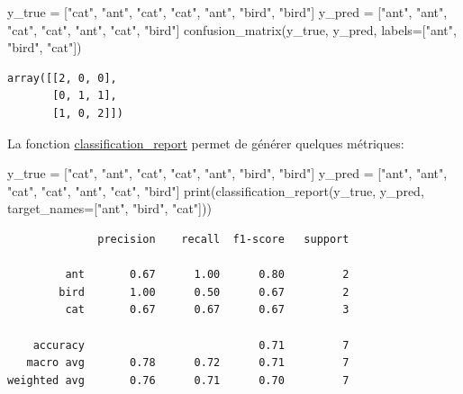 \documentclass[
]{article}
\newenvironment{Shaded}{}{}
\newcommand{\BuiltInTok}[1]{\textcolor[rgb]{0.00,0.50,0.00}{#1}}
\newcommand{\NormalTok}[1]{#1}
\newcommand{\OperatorTok}[1]{\textcolor[rgb]{0.40,0.40,0.40}{#1}}
\newcommand{\StringTok}[1]{\textcolor[rgb]{0.25,0.44,0.63}{#1}}
\begin{document}
\label{dd534953}
\label{cb16}
\begin{Shaded}
\begin{Highlighting}[]
\NormalTok{y\_true }\OperatorTok{=}\NormalTok{ [}\StringTok{"cat"}\NormalTok{, }\StringTok{"ant"}\NormalTok{, }\StringTok{"cat"}\NormalTok{, }\StringTok{"cat"}\NormalTok{, }\StringTok{"ant"}\NormalTok{, }\StringTok{"bird"}\NormalTok{, }\StringTok{"bird"}\NormalTok{]}
\NormalTok{y\_pred }\OperatorTok{=}\NormalTok{ [}\StringTok{"ant"}\NormalTok{, }\StringTok{"ant"}\NormalTok{, }\StringTok{"cat"}\NormalTok{, }\StringTok{"cat"}\NormalTok{, }\StringTok{"ant"}\NormalTok{, }\StringTok{"cat"}\NormalTok{, }\StringTok{"bird"}\NormalTok{]}
\NormalTok{confusion\_matrix(y\_true, y\_pred, labels}\OperatorTok{=}\NormalTok{[}\StringTok{"ant"}\NormalTok{, }\StringTok{"bird"}\NormalTok{, }\StringTok{"cat"}\NormalTok{])}
\end{Highlighting}
\end{Shaded}

\begin{verbatim}
array([[2, 0, 0],
       [0, 1, 1],
       [1, 0, 2]])
\end{verbatim}

La fonction
\href{https://scikit-learn.org/stable/modules/generated/sklearn.metrics.classification_report.html\#sklearn.metrics.classification_report}{classification\_report}
permet de générer quelques métriques:

\label{c4b26260}
\label{cb18}
\begin{Shaded}
\begin{Highlighting}[]
\NormalTok{y\_true }\OperatorTok{=}\NormalTok{ [}\StringTok{"cat"}\NormalTok{, }\StringTok{"ant"}\NormalTok{, }\StringTok{"cat"}\NormalTok{, }\StringTok{"cat"}\NormalTok{, }\StringTok{"ant"}\NormalTok{, }\StringTok{"bird"}\NormalTok{, }\StringTok{"bird"}\NormalTok{]}
\NormalTok{y\_pred }\OperatorTok{=}\NormalTok{ [}\StringTok{"ant"}\NormalTok{, }\StringTok{"ant"}\NormalTok{, }\StringTok{"cat"}\NormalTok{, }\StringTok{"cat"}\NormalTok{, }\StringTok{"ant"}\NormalTok{, }\StringTok{"cat"}\NormalTok{, }\StringTok{"bird"}\NormalTok{]}
\BuiltInTok{print}\NormalTok{(classification\_report(y\_true, y\_pred, target\_names}\OperatorTok{=}\NormalTok{[}\StringTok{"ant"}\NormalTok{, }\StringTok{"bird"}\NormalTok{, }\StringTok{"cat"}\NormalTok{]))}
\end{Highlighting}
\end{Shaded}

\begin{verbatim}
              precision    recall  f1-score   support

         ant       0.67      1.00      0.80         2
        bird       1.00      0.50      0.67         2
         cat       0.67      0.67      0.67         3

    accuracy                           0.71         7
   macro avg       0.78      0.72      0.71         7
weighted avg       0.76      0.71      0.70         7
\end{verbatim}
\end{document}
